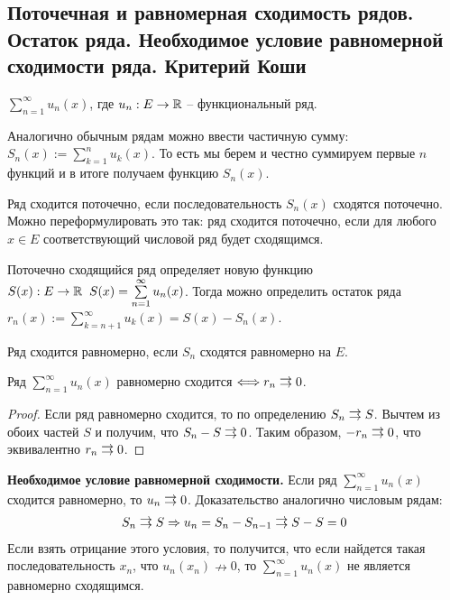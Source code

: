 \subsection{Поточечная и равномерная сходимость рядов. Остаток ряда. Необходимое условие равномерной сходимости ряда. Критерий Коши}
\begin{conj}
    $\sum\limits_{n = 1}^\infty u_n(x)$, где $u_n: E \to \mathbb{R}$ -- функциональный ряд.    
\end{conj} 
Аналогично обычным рядам можно ввести частичную сумму: $S_n(x) := \sum\limits_{k = 1}^n u_k(x)$.
То есть мы берем и честно суммируем первые $n$ функций и в итоге получаем функцию $S_n(x)$.
\begin{conj}
    Ряд сходится поточечно, если последовательность $S_n(x)$ сходятся поточечно.
    Можно переформулировать это так: ряд сходится поточечно, если для любого $x \in E$ соответствующий числовой ряд будет сходящимся.

    Поточечно сходящийся ряд определяет новую функцию $S(x): E \to \mathbb{R} \;\; S(x) = \sum\limits_{n = 1}^\infty u_n(x)$.
    Тогда можно определить остаток ряда $r_n(x) := \sum\limits_{k = n + 1}^\infty u_k(x) = S(x) - S_n(x)$.
\end{conj}

\vspace*{5mm}

\begin{conj}
    Ряд сходится равномерно, если $S_n$ сходятся равномерно на $E$.
\end{conj}

\begin{theorem}
    Ряд $\sum\limits_{n = 1}^\infty u_n(x)$ равномерно сходится $\Longleftrightarrow r_n \doublerightarrow 0$. 
\end{theorem}
\begin{proof}
    Если ряд равномерно сходится, то по определению $S_n \doublerightarrow S$.
    Вычтем из обоих частей $S$ и получим, что $S_n - S \doublerightarrow 0$.
    Таким образом, $-r_n \doublerightarrow 0$, что эквивалентно $r_n \doublerightarrow 0$.
\end{proof}

\vspace*{5mm}

\textbf{Необходимое условие равномерной сходимости.} Если ряд $\sum\limits_{n = 1}^\infty u_n(x)$ сходится равномерно, то $u_n \doublerightarrow 0$.
Доказательство аналогично числовым рядам: 
\begin{gather*}
    S_n \doublerightarrow S \Rightarrow u_n = S_n - S_{n-1} \doublerightarrow S - S = 0
\end{gather*}
Если взять отрицание этого условия, то получится, что если найдется такая последовательность $x_n$, что $u_n(x_n) \nrightarrow 0$, то $\sum\limits_{n = 1}^\infty u_n(x)$ не является равномерно сходящимся.
    
